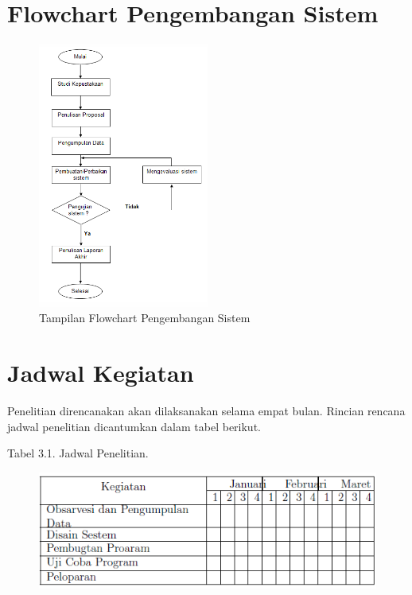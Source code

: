 \documentclass{jtetiproposalskripsi}
\begin{document}
\section{Flowchart Pengembangan Sistem}
\begin{figure}[h]
\centering 
 \includegraphics[width=0.5\textwidth]{gambar/2}  
 \caption{Tampilan Flowchart Pengembangan Sistem}
\end{figure}
\newpage
\section{Jadwal Kegiatan}
Penelitian direncanakan akan dilaksanakan selama empat bulan. Rincian rencana jadwal penelitian dicantumkan dalam tabel berikut.

\begin{center}
Tabel 3.1. Jadwal Penelitian.
\end{center}
\vspace{-0.5cm}
\begin{figure}[ht!]
  \centering
    \includegraphics[width=13cm]{gambar/3}
\end{figure}
\end{document}
